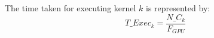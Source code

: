 \documentclass[conference]{IEEEtran}
\theoremstyle{definition}
\begin{document}
The time taken for executing kernel $k$ is represented by:
{\scriptsize
\begin{equation}\label{e15}
T\_Exec_k = \frac{N\_C_k}{F_{GPU}} 
\end{equation}
}%

% 
% 
% 

% 
% 
% 
\end{document}
